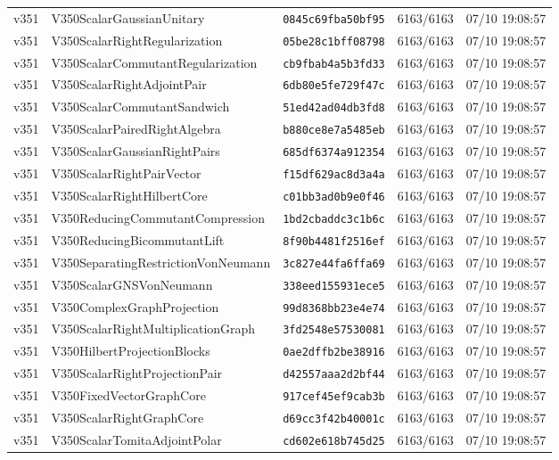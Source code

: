 \documentclass[11pt]{article}
\theoremstyle{definition}\newtheorem{deriv}{Derivation}
\begin{document}
{\begin{longtable}{@{}lllll@{}}
v351 & V350ScalarGaussianUnitary & \texttt{0845c69fba50bf95} & 6163/6163 & 07/10 19:08:57 \\
v351 & V350ScalarRightRegularization & \texttt{05be28c1bff08798} & 6163/6163 & 07/10 19:08:57 \\
v351 & V350ScalarCommutantRegularization & \texttt{cb9fbab4a5b3fd33} & 6163/6163 & 07/10 19:08:57 \\
v351 & V350ScalarRightAdjointPair & \texttt{6db80e5fe729f47c} & 6163/6163 & 07/10 19:08:57 \\
v351 & V350ScalarCommutantSandwich & \texttt{51ed42ad04db3fd8} & 6163/6163 & 07/10 19:08:57 \\
v351 & V350ScalarPairedRightAlgebra & \texttt{b880ce8e7a5485eb} & 6163/6163 & 07/10 19:08:57 \\
v351 & V350ScalarGaussianRightPairs & \texttt{685df6374a912354} & 6163/6163 & 07/10 19:08:57 \\
v351 & V350ScalarRightPairVector & \texttt{f15df629ac8d3a4a} & 6163/6163 & 07/10 19:08:57 \\
v351 & V350ScalarRightHilbertCore & \texttt{c01bb3ad0b9e0f46} & 6163/6163 & 07/10 19:08:57 \\
v351 & V350ReducingCommutantCompression & \texttt{1bd2cbaddc3c1b6c} & 6163/6163 & 07/10 19:08:57 \\
v351 & V350ReducingBicommutantLift & \texttt{8f90b4481f2516ef} & 6163/6163 & 07/10 19:08:57 \\
v351 & V350SeparatingRestrictionVonNeumann & \texttt{3c827e44fa6ffa69} & 6163/6163 & 07/10 19:08:57 \\
v351 & V350ScalarGNSVonNeumann & \texttt{338eed155931ece5} & 6163/6163 & 07/10 19:08:57 \\
v351 & V350ComplexGraphProjection & \texttt{99d8368bb23e4e74} & 6163/6163 & 07/10 19:08:57 \\
v351 & V350ScalarRightMultiplicationGraph & \texttt{3fd2548e57530081} & 6163/6163 & 07/10 19:08:57 \\
v351 & V350HilbertProjectionBlocks & \texttt{0ae2dffb2be38916} & 6163/6163 & 07/10 19:08:57 \\
v351 & V350ScalarRightProjectionPair & \texttt{d42557aaa2d2bf44} & 6163/6163 & 07/10 19:08:57 \\
v351 & V350FixedVectorGraphCore & \texttt{917cef45ef9cab3b} & 6163/6163 & 07/10 19:08:57 \\
v351 & V350ScalarRightGraphCore & \texttt{d69cc3f42b40001c} & 6163/6163 & 07/10 19:08:57 \\
v351 & V350ScalarTomitaAdjointPolar & \texttt{cd602e618b745d25} & 6163/6163 & 07/10 19:08:57 \\

\end{longtable}}
\end{document}
